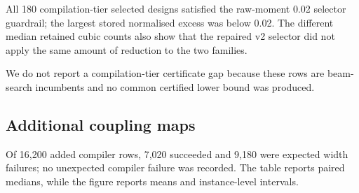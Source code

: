 \documentclass[a4paper,onecolumn,11pt,unpublished]{quantumarticle}
\theoremstyle{remark}
\begin{document}
\begin{table}[!htbp]
    \centering
    \small
    \caption{Median diagnostics for the 90 compilation-tier selective designs
    in each family.  Fibre risk is the normalised raw-moment excess used by the v2
    selector guardrail; the threshold is 0.02.  Time is selector runtime in seconds.}
    \label{tab:e2-selector-diagnostics}

\end{table}
All 180 compilation-tier selected designs satisfied the raw-moment 0.02
selector guardrail; the
largest stored normalised excess was below 0.02.  The different median retained
cubic counts also show that the repaired v2 selector did not apply the same amount
of reduction to the two families.

We do not report a compilation-tier
certificate gap because these rows are beam-search incumbents and no common
certified lower bound was produced.


\FloatBarrier
\subsection{Additional coupling maps}
\label{app:results-connectivity}

Of 16,200 added compiler rows, 7,020 succeeded and 9,180 were expected width
failures; no unexpected compiler failure was recorded. The table reports
paired medians, while the figure reports means and instance-level intervals.
\end{document}
